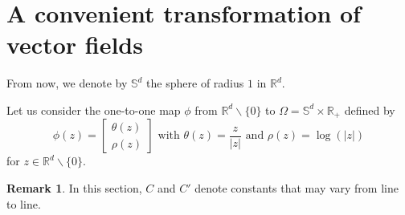 \documentclass[a4paper,12pt]{article}
\theoremstyle{definition}
\newtheorem{remark}[theorem]{Remark}
\newcommand{\vd}{\,\mathrm{d}}
\newcommand{\bx}{\mathbf{x}}
\newcommand{\by}{\mathbf{y}}
\newcommand{\bz}{\mathbf{z}}
\newcommand{\RR}{\mathbb{R}}
\newcommand{\SSS}{\mathbb{S}}
\DeclareMathOperator{\Lip}{Lip}
\newcommand{\note}[1]{\marginpar{\texttt{\tiny\begin{minipage}{3cm}#1\end{minipage}}}}
\begin{document}
%
%
%


\section{A convenient transformation of vector fields}
\label{sec:log}
From now, we denote by $\SSS^d$ the sphere
of radius $1$ in $\RR^d$.

Let us consider the one-to-one map $\phi$ from $\RR^d\backslash\{0\}$ to $\Omega=\SSS^d\times \RR_+$
defined by 
\begin{equation*}
\phi(z)=\begin{bmatrix}
\theta(z)\\
\rho(z)
\end{bmatrix}
\text{ with }\theta(z)=\dfrac{z}{|z|}
\text{ and }\rho(z)=\log(|z|)
\end{equation*}
for $z\in\RR^d\backslash\{0\}$. 

\begin{remark}
In this section, $C$ and $C'$ denote constants that may vary from line to line.
\end{remark}
\end{document}
